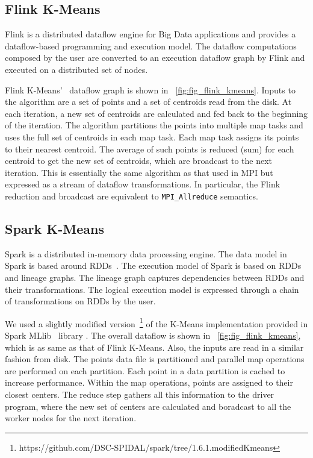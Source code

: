 \documentclass[10pt, conference, compsocconf]{IEEEtran}
\begin{document}
\subsection{Flink K-Means}
Flink is a distributed  dataflow engine for Big Data applications and provides a dataflow-based programming and execution model. The dataflow computations composed by the user are converted to an execution dataflow graph by Flink and executed on a distributed set of nodes.

Flink K-Means'~\cite{flink-kmeans} dataflow graph is shown in \figurename~\ref{fig:fig_flink_kmeans}. Inputs to the algorithm are a set of points and a set of centroids read from the disk. At each iteration, a new set of centroids are calculated and fed back to the beginning of the iteration. The algorithm partitions the points into multiple map tasks and uses the full set of centroids in each map task. Each map task assigns its points to their nearest centroid. The average of such points is reduced (sum) for each centroid to get the new set of centroids, which are broadcast to the next iteration. This is essentially the same algorithm as that used in \ac{MPI} but expressed as a stream of dataflow transformations. In particular, the Flink reduction and broadcast are equivalent to \texttt{MPI\_Allreduce} semantics.

\subsection{Spark K-Means}
Spark is a distributed in-memory data processing engine. The data model in Spark is based around \acp{RDD}~\cite{zaharia2012resilient}. The execution model of Spark is based on \acp{RDD} and lineage graphs. The lineage graph captures dependencies between \acp{RDD} and their transformations. The logical execution model is expressed through a chain of transformations on \acp{RDD} by the user.

We used a slightly modified version~\footnote{https://github.com/DSC-SPIDAL/spark/tree/1.6.1.modifiedKmeans} of the K-Means implementation provided in Spark MLlib~\cite{meng2016mllib} library . The overall  dataflow is shown in \figurename~\ref{fig:fig_flink_kmeans}, which is as same as that of Flink K-Means. Also, the inputs are read in a similar fashion from disk. The points data file is partitioned and parallel map operations are performed on each partition. Each point in a data partition is cached to increase performance. Within the map operations, points are assigned to their closest centers. The reduce step gathers all this information to the driver program, where the new set of centers are calculated and boradcast to all the worker nodes for the next iteration. 
\end{document}
